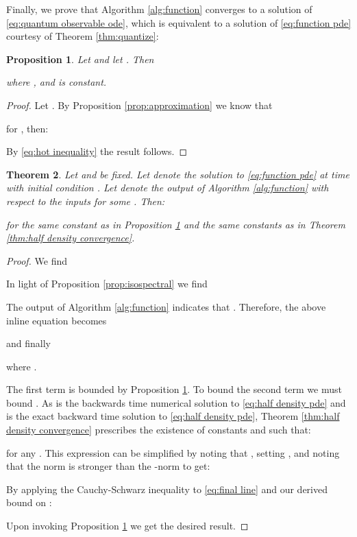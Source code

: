 \documentclass[final,leqno]{amsart}
\newtheorem{theorem}{Theorem}[section]
\newtheorem{proposition}[theorem]{Proposition}
\begin{document}
Finally, we prove that Algorithm \ref{alg:function} converges to a solution of \eqref{eq:quantum observable ode}, which is equivalent to a solution of \eqref{eq:function pde} courtesy of Theorem \ref{thm:quantize}:

\begin{proposition} \label{prop:function approximation}
	Let  and let .  Then
	
	where , and  is constant.
\end{proposition}
\begin{proof}
	Let .  By Proposition \ref{prop:approximation} we know that
	
	for , then:
	
	By \eqref{eq:hot inequality} the result follows.
\end{proof}

\begin{theorem} \label{thm:function convergence}
	Let  and  be fixed.
	Let  denote the solution to \eqref{eq:function pde} at time  with initial condition .
	Let  denote the output of Algorithm \ref{alg:function} with respect to the inputs  for some .
	Then:
	
	for the same constant  as in Proposition \ref{prop:function approximation} and the same constants  as in Theorem \ref{thm:half density convergence}.
\end{theorem}

\begin{proof}
	We find
	
	In light of Proposition \ref{prop:isospectral} we find
	
	The output of Algorithm \ref{alg:function} indicates that .
	Therefore, the above inline equation becomes
	
	and finally
	
	where .
	
	The first term is bounded by Proposition \ref{prop:function approximation}.
	To bound the second term we must bound .
	As  is the backwards time numerical solution to \eqref{eq:half density pde} and  is the exact backward time solution to \eqref{eq:half density pde},
	Theorem \ref{thm:half density convergence} prescribes the existence of constants  and  such that:
	
	for any .
	This expression can be simplified by noting that , setting , and noting that the  norm is stronger than the -norm to get:
	
	By applying the Cauchy-Schwarz inequality to \eqref{eq:final line} and our derived bound on :
	
	Upon invoking Proposition \ref{prop:function approximation} we get the desired result.
\end{proof}
\end{document}
